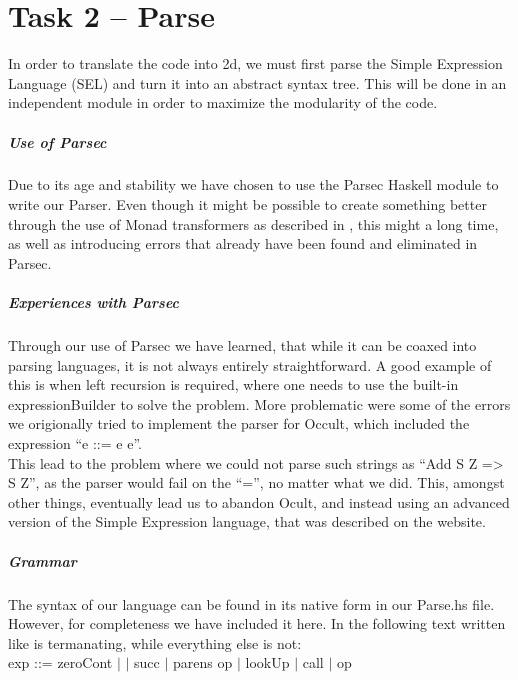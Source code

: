 \chapter*{Task 2 -- Parse}
In order to translate the code into 2d, we must first parse the Simple Expression Language (SEL) and turn it into an abstract syntax tree. This will be done in an independent module in order to maximize the modularity of the code.

\paragraph{Use of Parsec}
Due to its age and stability we have chosen to use the Parsec Haskell module to write our Parser. Even though it might be possible to create something better through the use of Monad transformers as described in \cite{partial+parsing}, this might a long time, as well as introducing errors that already have been found and eliminated in Parsec.

\paragraph{Experiences with Parsec}
Through our use of Parsec we have learned, that while it can be coaxed into parsing languages, it is not always entirely straightforward. A good example of this is when left recursion is required, where one needs to use the built-in expressionBuilder to solve the problem. More problematic were some of the errors we origionally tried to implement the parser for Occult, which included the expression ``e ::= e e''.\\

This lead to the problem where we could not parse such strings as ``Add S Z => S Z'', as the parser would fail on the ``='', no matter what we did. This, amongst other things, eventually lead us to abandon Ocult, and instead using an advanced version of the Simple Expression language, that was described on the website.

\paragraph{Grammar}
The syntax of our language can be found in its native form in our
Parse.hs file. However, for completeness we have included it here. In
the following text written like  is termanating, while
everything else is not:\\

exp ::= zeroCont $\mid$  $\mid$ succ $\mid$ parens op $\mid$ lookUp $\mid$ call $\mid$ op\\

